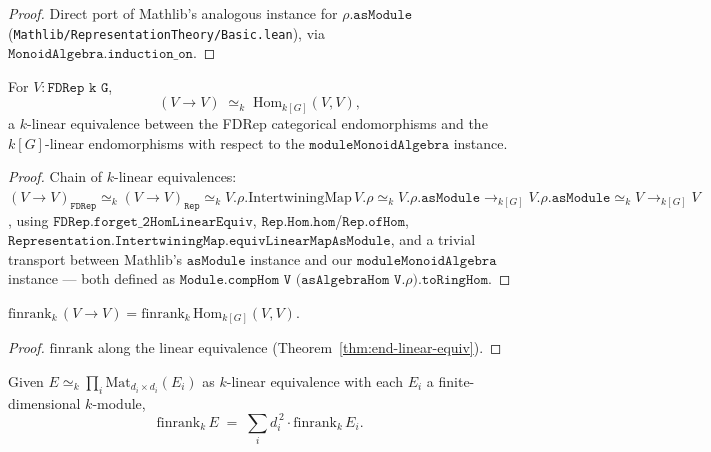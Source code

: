 \begin{proof}\leanok
  Direct port of Mathlib's analogous instance for $\rho.\texttt{asModule}$
  (\texttt{Mathlib/RepresentationTheory/Basic.lean}), via
  $\texttt{MonoidAlgebra.induction\_on}$.
\end{proof}

\begin{theorem}
  \label{thm:end-linear-equiv}
  \leanok
  For $V : \texttt{FDRep k G}$,
  \[
     (V \to V) \;\simeq_{k}\; \mathrm{Hom}_{k[G]}(V, V),
  \]
  a $k$-linear equivalence between the FDRep categorical endomorphisms
  and the $k[G]$-linear endomorphisms with respect to the
  $\texttt{moduleMonoidAlgebra}$ instance.
\end{theorem}

\begin{proof}\leanok
  Chain of $k$-linear equivalences:
  $(V \to V)_{\texttt{FDRep}} \simeq_k (V \to V)_{\texttt{Rep}}
   \simeq_k V.\rho.\mathrm{IntertwiningMap}\,V.\rho
   \simeq_k V.\rho.\texttt{asModule} \to_{k[G]} V.\rho.\texttt{asModule}
   \simeq_k V \to_{k[G]} V$, using
  $\texttt{FDRep.forget\_2HomLinearEquiv}$,
  $\texttt{Rep.Hom.hom}$/$\texttt{Rep.ofHom}$,
  $\texttt{Representation.IntertwiningMap.equivLinearMapAsModule}$, and a
  trivial transport between Mathlib's $\texttt{asModule}$ instance and
  our $\texttt{moduleMonoidAlgebra}$ instance — both defined as
  $\texttt{Module.compHom V (asAlgebraHom V.}\rho\texttt{).toRingHom}$.
\end{proof}

\begin{corollary}
  \label{cor:finrank-end-eq}
  \leanok
  $\mathrm{finrank}_k\,(V \to V) = \mathrm{finrank}_k\,\mathrm{Hom}_{k[G]}(V, V)$.
\end{corollary}

\begin{proof}\leanok
  $\mathrm{finrank}$ along the linear equivalence
  (Theorem~\ref{thm:end-linear-equiv}).
\end{proof}

\begin{lemma}
  \label{lem:finrank-end-pi-matrix}
  \leanok
  Given $E \simeq_k \prod_i \mathrm{Mat}_{d_i \times d_i}(E_i)$ as
  $k$-linear equivalence with each $E_i$ a finite-dimensional $k$-module,
  \[
     \mathrm{finrank}_k\,E \;=\; \sum_i d_i^{\,2}\cdot \mathrm{finrank}_k\,E_i.
  \]
\end{lemma}

